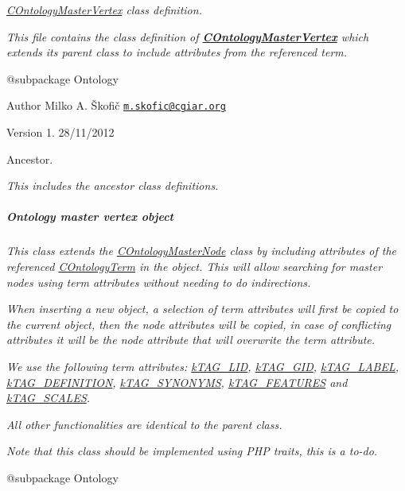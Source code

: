 {\itshape {\itshape \hyperlink{class_c_ontology_master_vertex}{C\-Ontology\-Master\-Vertex}} class definition.}

{\itshape This file contains the class definition of {\bfseries \hyperlink{class_c_ontology_master_vertex}{C\-Ontology\-Master\-Vertex}} which extends its parent class to include attributes from the referenced term.}

{\itshape \begin{DoxyVerb} @subpackage        Ontology
\end{DoxyVerb}
}

{\itshape \begin{DoxyAuthor}{Author}
Milko A. Škofič \href{mailto:m.skofic@cgiar.org}{\tt m.\-skofic@cgiar.\-org} 
\end{DoxyAuthor}
\begin{DoxyVersion}{Version}
1. 28/11/2012
\end{DoxyVersion}
Ancestor.}

{\itshape This includes the ancestor class definitions. \subparagraph*{Ontology master vertex object}}

{\itshape }

{\itshape This class extends the \hyperlink{class_c_ontology_master_node}{C\-Ontology\-Master\-Node} class by including attributes of the referenced \hyperlink{class_c_ontology_term}{C\-Ontology\-Term} in the object. This will allow searching for master nodes using term attributes without needing to do indirections.}

{\itshape When inserting a new object, a selection of term attributes will first be copied to the current object, then the node attributes will be copied, in case of conflicting attributes it will be the node attribute that will overwrite the term attribute.}

{\itshape We use the following term attributes\-: \hyperlink{}{k\-T\-A\-G\-\_\-\-L\-I\-D}, \hyperlink{}{k\-T\-A\-G\-\_\-\-G\-I\-D}, \hyperlink{}{k\-T\-A\-G\-\_\-\-L\-A\-B\-E\-L}, \hyperlink{}{k\-T\-A\-G\-\_\-\-D\-E\-F\-I\-N\-I\-T\-I\-O\-N}, \hyperlink{}{k\-T\-A\-G\-\_\-\-S\-Y\-N\-O\-N\-Y\-M\-S}, \hyperlink{}{k\-T\-A\-G\-\_\-\-F\-E\-A\-T\-U\-R\-E\-S} and \hyperlink{}{k\-T\-A\-G\-\_\-\-S\-C\-A\-L\-E\-S}.}

{\itshape All other functionalities are identical to the parent class.}

{\itshape Note that this class should be implemented using P\-H\-P traits, this is a to-\/do.}

{\itshape \begin{DoxyVerb} @subpackage        Ontology\end{DoxyVerb}
}


